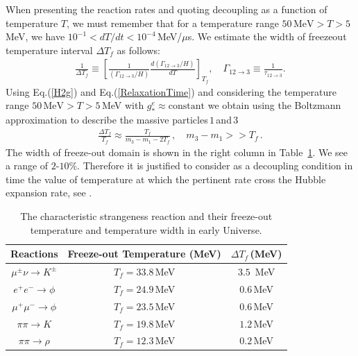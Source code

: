 When presenting the reaction rates and quoting decoupling as a function of temperature $T$, we must remember that for a temperature range $50\,\mathrm{MeV}>T>5$\,MeV, we have $10^{-1}<dT/dt<10^{-4}$\,MeV/$\mu$s. We estimate the width of freezeout temperature interval $\Delta T_f$  as follows:
\begin{align}
\frac{1}{\Delta T_f}\equiv \left[\frac{1}{(\Gamma_{12\to3}/H)}\frac{d(\Gamma_{12\to3}/H)}{dT}\right]_{T_f},\quad \Gamma_{12\to3}\equiv\frac{1}{\tau_{12\to3}}.
\end{align}
Using Eq.(\ref{H2g}) and Eq.(\ref{RelaxationTime}) and considering the temperature range $50\,\mathrm{MeV}>T>5$\,MeV with $g^e_\ast\approx\mathrm{constant}$ we obtain using the Boltzmann approximation to describe the  massive particles\,$1$\,and\,$3$
\begin{align}\label{DeltaFreezeout}
 \frac{\Delta T_f}{ T_f} \approx\frac{T_f  }{ m_3 - m_1 -2T_f}\,,\quad m_3 - m_1>> T_f\,.
\end{align}
The width of freeze-out domain is shown in the right column in Table~\ref{FreezeoutTemperature_table}. We see a range of $2$-$10\%$. Therefore it is justified to consider as a decoupling condition in time the value of temperature at which the pertinent rate cross the Hubble expansion rate, see .
 
\begin{table} 
\centering
\begin{tabular}{c| c| c}
\hline\hline
Reactions &Freeze-out Temperature (MeV) & {$\Delta T_f$\,(MeV)} \\
\hline
$\mu^\pm\nu\rightarrow K^\pm$ & $T_f=33.8$\,MeV & {$3.5$ \,MeV}\\ 
\hline
$e^+e^-\rightarrow \phi$ & $T_f=24.9$\,MeV &{$0.6$\,MeV}\\
$\mu^+\mu^-\rightarrow\phi$ & $T_f=23.5$\,MeV &{$0.6$\,MeV}\\
\hline
 $\pi\pi\rightarrow K$ & $T_f=19.8$\,MeV&{$1.2$\,MeV}\\
\hline
$\pi\pi\rightarrow\rho$ & $T_f=12.3$\,MeV&{$0.2$\,MeV}\\
\hline\hline
\end{tabular}
\caption{The characteristic strangeness reaction and their freeze-out temperature and temperature width in early Universe.}
\label{FreezeoutTemperature_table} 
\end{table}


